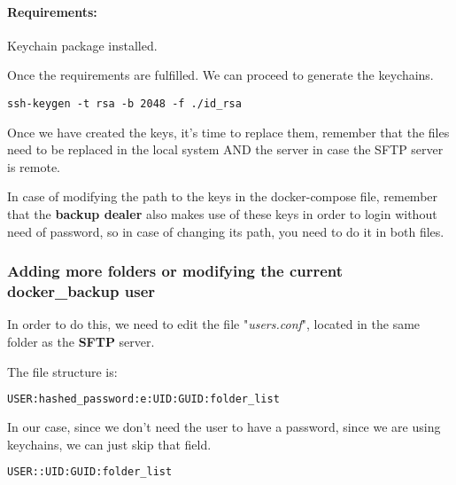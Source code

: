 \paragraph{Requirements:} Keychain package installed.
\begin{flushleft}

    Once the requirements are fulfilled.
    We can proceed to generate the keychains.
    \begin{lstlisting}[label={lst:generating_keychain,language=bash}]
ssh-keygen -t rsa -b 2048 -f ./id_rsa
    \end{lstlisting}
\end{flushleft}
\begin{flushleft}
    Once we have created the keys, it's time to replace them, remember that the files need to be replaced in the local
    system AND the server in case the SFTP server is remote.
\end{flushleft}
\begin{flushleft}
    In case of modifying the path to the keys in the docker-compose file, remember that the \textbf{backup dealer} also
    makes use of these keys in order to login without need of password, so in case of changing its path, you need to do
    it in both files.
\end{flushleft}
%

\subsubsection[Adding more folders or modifying the current docker\_backup user]{Adding more folders or modifying the current docker\_backup user}
\begin{flushleft}
    In order to do this, we need to edit the file "\textit{users.conf}", located in the same folder as the \textbf{SFTP} server.
    
    The file structure is:

\begin{lstlisting}[language=bash,label={lst:users.conf_hash_structure}]
USER:hashed_password:e:UID:GUID:folder_list
\end{lstlisting}
    In our case, since we don't need the user to have a password, since we are using keychains, we can just skip that field.
    \begin{lstlisting}[language=bash,label={lst:users.conf_structure}]
USER::UID:GUID:folder_list
    \end{lstlisting}
\end{flushleft}

